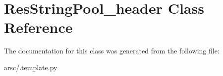 \hypertarget{classResStringPool__header}{}\section{Res\+String\+Pool\+\_\+header Class Reference}
\label{classResStringPool__header}


The documentation for this class was generated from the following file\+:\begin{DoxyCompactItemize}
\item 
arsc/.\+template.\+py\end{DoxyCompactItemize}
